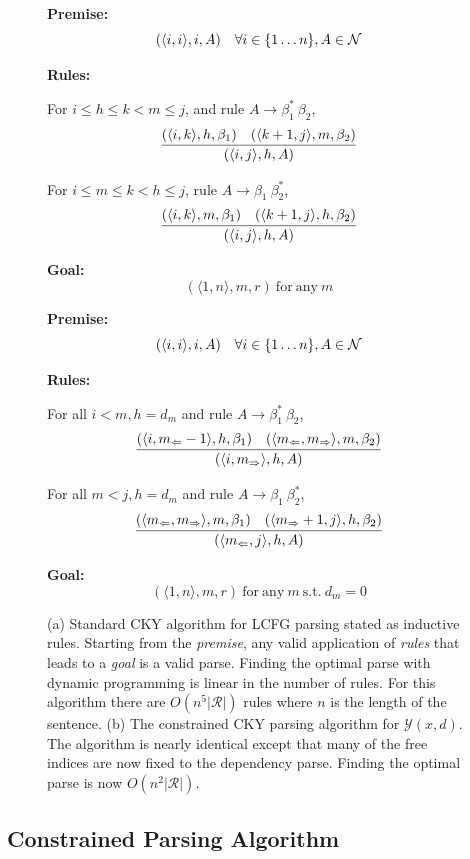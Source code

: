 \documentclass[11pt,letterpaper]{article}
\newcommand{\rules}{\mathcal{R}}
\newcommand{\Left}[1]{#1_{\Leftarrow}}
\newcommand{\Right}[1]{#1_{\Rightarrow}}
\newcommand{\Span}[1]{\langle #1 \rangle}
\newcommand{\Root}{r}
\newcommand{\RuleA}[3]{#1 \rightarrow #2^*\ #3}
\newcommand{\RuleB}[3]{#1 \rightarrow #2\ #3^*}
\newcommand{\tri}{\Span{\Left{m}, \Right{m}}}
\begin{document}
\begin{figure}
  \begin{multicols}{2}
  \noindent \textbf{Premise:}
  \[(\Span{i, i}, i, A)\ \ \ \forall i \in \{1 \ldots n\}, A \in {\cal N}\]

  \noindent\textbf{Rules:}

   For $i\leq h \leq k < m \leq j$,  and  rule  $\RuleA{A}{\beta_1}{\beta_2}$,
   \[\infer{( \Span{i, j},  h,  A)}{( \Span{i, k}, h, \beta_1)  &  ( \Span{k+1, j}, m, \beta_2) } \]

   For $i\leq m \leq k < h \leq j$, rule  $\RuleB{A}{\beta_1}{\beta_2}$,
   \[\infer{(\Span{i, j},  h, A)}{(\Span{i, k}, m, \beta_1)  &  (\Span{k+1, j}, h, \beta_2) }  \]

\noindent \textbf{Goal:}
\[ (\Span{1, n}, m, \Root) \mathrm{\ for\ any }\ m\]

\label{fig:cky}

  \noindent \textbf{Premise:}
  \[(\langle i,i \rangle, i, A)\ \ \ \forall i \in \{1 \ldots n\}, A \in {\cal N}\]

  \noindent\textbf{Rules:}

  For all   $i < m, h = d_m$  and rule  $\RuleA{A}{\beta_1}{\beta_2}$,
  \[\infer{( \Span{ i, \Right{m} }, h, A)}{(\Span{i, \Left{m}-1}, h, \beta_1)  &  (\tri, m, \beta_2) } \]

  For all    $m < j, h = d_m$ and  rule  $\RuleB{A}{\beta_1}{\beta_2}$,
  \[ \infer{( \Span{\Left{m}, j}, h, A)}{(\tri, m, \beta_1)  &  (\Span{\Right{m}+ 1, j}, h, \beta_2) } \]

\noindent \textbf{Goal:}
\[(\Span{1, n}, m, \Root) \mathrm{\ for\ any }\ m \mathrm{\ s.t. \ } d_m = 0 \]

\end{multicols}
\label{fig:cky_new}
\caption{(a) Standard CKY algorithm for LCFG parsing stated as inductive rules. Starting from the \textit{premise}, any valid application of \textit{rules} that leads to a \textit{goal} is a valid parse. Finding the optimal parse with dynamic programming is linear in the number of rules. For this algorithm there are $O(n^5|\rules|)$ rules where $n$ is the length of the sentence. (b) The constrained CKY parsing algorithm for $\mathcal{Y}(x, d)$. The algorithm is nearly identical except that many of the free indices are now fixed to the dependency parse. Finding the optimal parse is now $O(n^2|\rules|)$.}
\end{figure}

\subsection{Constrained Parsing Algorithm}
\end{document}
